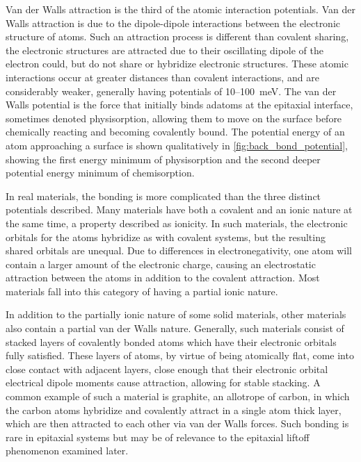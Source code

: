 Van der Walls attraction is the third of the atomic interaction potentials.
Van der Walls attraction is due to the dipole-dipole interactions between the electronic structure of atoms.
Such an attraction process is different than covalent sharing, the electronic structures are attracted due to their oscillating dipole of the electron could, but do not share or hybridize electronic structures.
These atomic interactions occur at greater distances than covalent interactions, and are considerably weaker, generally having potentials of 10--100~meV\@. The van der Walls potential is the force that initially binds adatoms at the epitaxial interface, sometimes denoted physisorption, allowing them to move on the surface before chemically reacting and becoming covalently bound.
The potential energy of an atom approaching a surface is shown qualitatively in \cref{fig:back_bond_potential}, showing the first energy minimum of physisorption and the second deeper potential energy minimum of chemisorption.

In real materials, the bonding is more complicated than the three distinct potentials described.
Many materials have both a covalent and an ionic nature at the same time, a property described as ionicity.
In such materials, the electronic orbitals for the atoms hybridize as with covalent systems, but the resulting shared orbitals are unequal.
Due to differences in electronegativity, one atom will contain a larger amount of the electronic charge, causing an electrostatic attraction between the atoms in addition to the covalent attraction.
Most materials fall into this category of having a partial ionic nature.

In addition to the partially ionic nature of some solid materials, other materials also contain a partial van der Walls nature.
Generally, such materials consist of stacked layers of covalently bonded atoms which have their electronic orbitals fully satisfied.
These layers of atoms, by virtue of being atomically flat, come into close contact with adjacent layers, close enough that their electronic orbital electrical dipole moments cause attraction, allowing for stable stacking.
A common example of such a material is graphite, an allotrope of carbon, in which the carbon atoms hybridize and covalently attract in a single atom thick layer, which are then attracted to each other via van der Walls forces.
Such bonding is rare in epitaxial systems but may be of relevance to the epitaxial liftoff phenomenon examined later.


